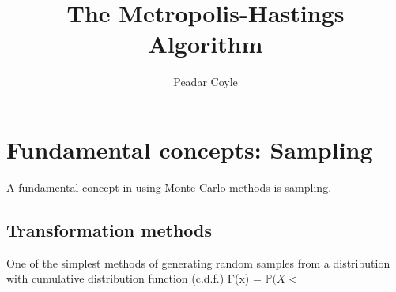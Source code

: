 \documentclass[a4paper,10pt]{article}
\title{The Metropolis-Hastings Algorithm}
\author{Peadar Coyle}
\newcommand{\lt}{<}
\begin{document}
\maketitle

\begin{abstract}

\end{abstract}

\section{Fundamental concepts: Sampling}
A fundamental concept in using Monte Carlo methods is sampling.
\subsection{Transformation methods}
One of the simplest methods of generating random samples from a distribution with cumulative distribution function 
(c.d.f.) F(x) = $\mathbb{P}(X \lt$
\end{document}

